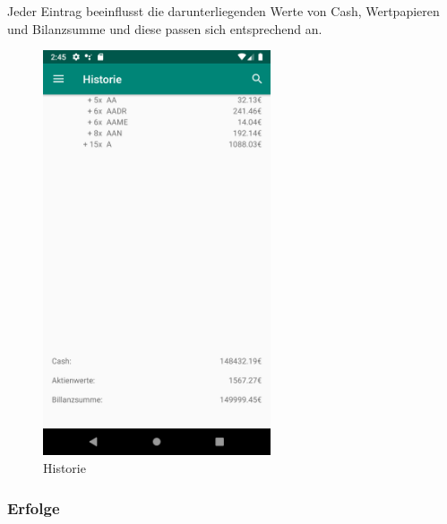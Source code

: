 \documentclass[10pt]{scrartcl}
\begin{document}
Jeder Eintrag beeinflusst die darunterliegenden Werte von Cash, Wertpapieren und Bilanzsumme und diese passen sich entsprechend an.

\begin{figure}[H]
	\centering
	\includegraphics[width=0.6\textwidth]{Bilder/Applikation/Historie.png}
	\caption{Historie}
\end{figure}

\subsubsection{Erfolge}
\end{document}

